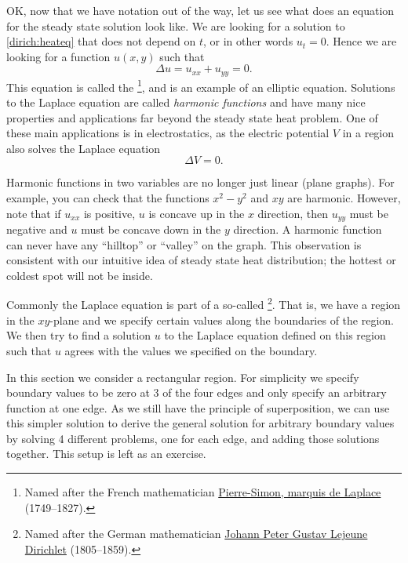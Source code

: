 \documentclass{ximera}
\begin{document}
OK\@, now that we have notation out of the way, let us see what does an equation for the steady state solution look like.  We are looking for a solution to \eqref{dirich:heateq} that does not depend on $t$, or in other words $u_t = 0$.  Hence we are looking for a function $u(x,y)$ such that
\begin{equation*}
    \Delta u = u_{xx} + u_{yy} = 0 .
\end{equation*}
This equation is called the \emph{}%
\footnote{Named after the French mathematician \href{https://en.wikipedia.org/wiki/Laplace}{Pierre-Simon, marquis de Laplace} (1749--1827).}, 
and is an example of an elliptic equation. Solutions to the Laplace equation are called \emph{harmonic functions} and have many nice properties and applications far beyond the steady state heat problem. One of these main applications is in electrostatics, as the electric potential $V$ in a region also solves the Laplace equation
\[ 
    \Delta V = 0. 
\]

Harmonic functions in two variables are no longer just linear (plane graphs).  For example, you can check that the functions $x^2-y^2$ and $xy$ are harmonic.  However, note that if $u_{xx}$ is positive, $u$ is concave up in the $x$ direction, then $u_{yy}$ must be negative and $u$ must be concave down in the $y$ direction.  A harmonic function can never have any ``hilltop'' or ``valley'' on the graph.  This observation is consistent with our intuitive idea of steady state heat distribution; the hottest or coldest spot will not be inside.

Commonly the Laplace equation is part of a so-called \emph{}%
\footnote{Named after the German mathematician \href{https://en.wikipedia.org/wiki/Dirichlet}{Johann Peter Gustav Lejeune Dirichlet} (1805--1859).}.
That is, we have a region in the $xy$-plane and we specify certain values along the boundaries of the region.  We then try to find a solution $u$ to the Laplace equation defined on this region such that $u$ agrees with the values we specified on the boundary.

In this section we consider a rectangular region.  For simplicity we specify boundary values to be zero at 3 of the four edges and only specify an arbitrary function at one edge.  As we still have the principle of superposition, we can use this simpler solution to derive the general solution for arbitrary boundary values by solving 4 different problems, one for each edge, and adding those solutions together. This setup is left as an exercise.
\end{document}
